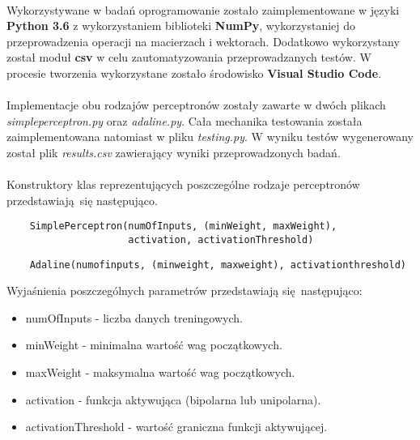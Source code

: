 \documentclass[../main.tex]{subfiles}
\begin{document}
    \paragraph{}
    Wykorzystywane w badań oprogramowanie zostało zaimplementowane w języki \textbf{Python 3.6} z wykorzystaniem biblioteki \textbf{NumPy}, wykorzystaniej do przeprowadzenia operacji na macierzach i wektorach. Dodatkowo wykorzystany został moduł \textbf{csv} w celu zautomatyzowania przeprowadzanych testów. W procesie tworzenia wykorzystane zostało środowisko \textbf{Visual Studio Code}.
    
    \paragraph{}
    Implementacje obu rodzajów perceptronów zostały zawarte w dwóch plikach \emph{simpleperceptron.py} oraz \emph{adaline.py}. Cała mechanika testowania została zaimplementowana natomiast w pliku \emph{testing.py}. W wyniku testów wygenerowany został plik \emph{results.csv} zawierający wyniki przeprowadzonych badań.
    
    \paragraph{}
    Konstruktory klas reprezentujących poszczególne rodzaje perceptronów przedstawiają się następująco.
    
        \begin{verbatim}
    SimplePerceptron(numOfInputs, (minWeight, maxWeight),
                     activation, activationThreshold)
    \end{verbatim}

    \begin{verbatim}
    Adaline(numofinputs, (minweight, maxweight), activationthreshold)
    \end{verbatim}
    
        Wyjaśnienia poszczególnych parametrów przedstawiają się następująco:
    \begin{itemize}
     \item numOfInputs - liczba danych treningowych.
     \item minWeight - minimalna wartość wag początkowych.
     \item maxWeight - maksymalna wartość wag początkowych.
     \item activation - funkcja aktywująca (bipolarna lub unipolarna).
     \item activationThreshold - wartość graniczna funkcji aktywującej.
    \end{itemize}
\end{document}
